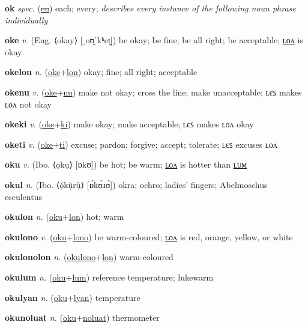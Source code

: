 \textbf{\hypertarget{ok}{ok}} \textit{spec.} (\hyperlink{en}{\sout{en}})
each; every; \textit{describes every instance of the following noun phrase individually}

\textbf{\hypertarget{oke}{oke}} \textit{v.} (Eng. ⟨okay⟩ [ˌoʊ̯ˈkʰeɪ̯])
be okay; be fine; be all right; be acceptable; \hyperlink{okelon}{ʟᴏᴧ} is okay

\textbf{\hypertarget{okelon}{okelon}} \textit{n.} (\hyperlink{oke}{oke}+\allowbreak \hyperlink{lon}{lon})
okay; fine; all right; acceptable

\textbf{\hypertarget{okenu}{okenu}} \textit{v.} (\hyperlink{oke}{oke}+\allowbreak \hyperlink{nu}{nu})
make not okay; cross the line; make unacceptable; ʟєꜱ makes ʟᴏᴧ not okay

\textbf{\hypertarget{okeki}{okeki}} \textit{v.} (\hyperlink{oke}{oke}+\allowbreak \hyperlink{ki}{ki})
make okay; make acceptable; ʟєꜱ makes ʟᴏᴧ okay

\textbf{\hypertarget{oketi}{oketi}} \textit{v.} (\hyperlink{oke}{oke}+\allowbreak \hyperlink{ti}{ti})
excuse; pardon; forgive; accept; tolerate; ʟєꜱ excuses ʟᴏᴧ

\textbf{\hypertarget{oku}{oku}} \textit{v.} (Ibo. ⟨ọkụ⟩ [ɒkʊ])
be hot; be warm; \hyperlink{okulon}{ʟᴏᴧ} is hotter than \hyperlink{okulum}{ʟᴜᴍ}

\textbf{\hypertarget{okul}{okul}} \textit{n.} (Ibo. ⟨ọ́kụ̀rụ̀⟩ [ɒ́kʊ̀ɹʊ̀])
okra; ochro; ladies’ fingers; Abelmoschus esculentus

\textbf{\hypertarget{okulon}{okulon}} \textit{n.} (\hyperlink{oku}{oku}+\allowbreak \hyperlink{lon}{lon})
hot; warm

\textbf{\hypertarget{okulono}{okulono}} \textit{v.} (\hyperlink{oku}{oku}+\allowbreak \hyperlink{lono}{lono})
be warm-coloured; \hyperlink{okulonolon}{ʟᴏᴧ} is red, orange, yellow, or white

\textbf{\hypertarget{okulonolon}{okulonolon}} \textit{n.} (\hyperlink{okulono}{okulono}+\allowbreak \hyperlink{lon}{lon})
warm-coloured

\textbf{\hypertarget{okulum}{okulum}} \textit{n.} (\hyperlink{oku}{oku}+\allowbreak \hyperlink{lum}{lum})
reference temperature; lukewarm

\textbf{\hypertarget{okulyan}{okulyan}} \textit{n.} (\hyperlink{oku}{oku}+\allowbreak \hyperlink{lyan}{lyan})
temperature

\textbf{\hypertarget{okunoluat}{okunoluat}} \textit{n.} (\hyperlink{oku}{oku}+\allowbreak \hyperlink{noluat}{noluat})
thermometer


